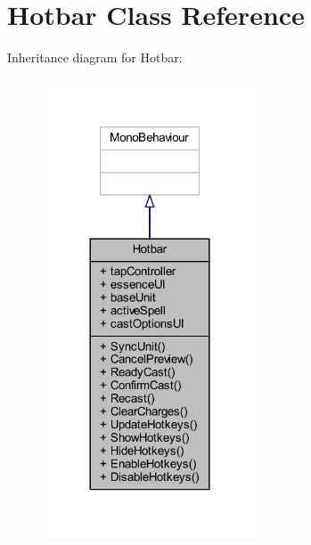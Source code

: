 \hypertarget{class_hotbar}{}\section{Hotbar Class Reference}
\label{class_hotbar}


Inheritance diagram for Hotbar\+:
\nopagebreak
\begin{figure}[H]
\begin{center}
\leavevmode
\includegraphics[width=180pt]{class_hotbar__inherit__graph}
\end{center}
\end{figure}



